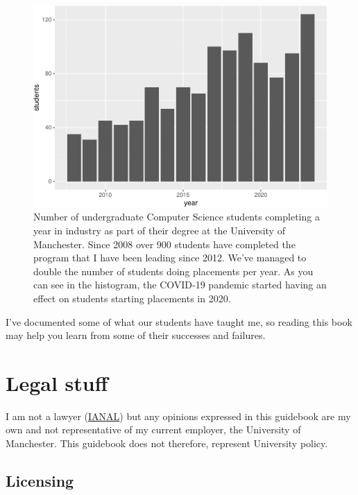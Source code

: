 \documentclass[
]{book}
\begin{document}
\begin{figure}

{\centering \includegraphics[width=1\linewidth]{cdyf_files/figure-latex/ie-fig-1} 

}

\caption{Number of undergraduate Computer Science students completing a year in industry as part of their degree at the University of Manchester. Since 2008 over 900 students have completed the program that I have been leading since 2012. We've managed to double the number of students doing placements per year. As you can see in the histogram, the COVID-19 pandemic started having an effect on students starting placements in 2020.}\label{fig:ie-fig}
\end{figure}



I've documented some of what our students have taught me, so reading this book may help you learn from some of their successes and failures.

\hypertarget{legal}{%
\section{Legal stuff}\label{legal}}

I am not a lawyer (\href{https://en.wikipedia.org/wiki/IANAL}{IANAL}) but any opinions expressed in this guidebook are my own and not representative of my current employer, the University of Manchester. This guidebook does not therefore, represent University policy.

\hypertarget{license}{%
\subsection{Licensing}\label{license}}
\end{document}
